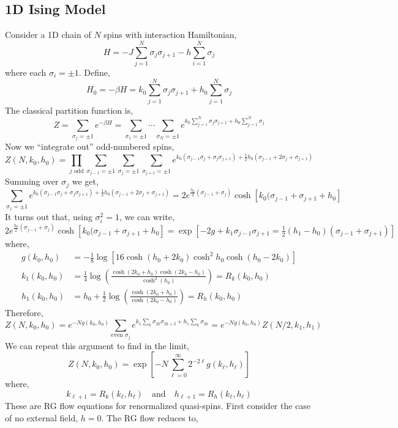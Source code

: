 \documentclass[12pt]{extarticle}
\begin{document}
\subsection{1D Ising Model}

Consider a 1D chain of $N$ spins with interaction Hamiltonian,
\[ H = - J \sum_{j = 1}^N \sigma_j \sigma_{j + 1} - h \sum_{i = 1}^N \sigma_j \]
where each $\sigma_i = \pm 1$. Define,
\[ H_0 = - \beta H = k_0 \sum_{j = 1}^N \sigma_j \sigma_{j + 1} + h_0 \sum_{j = 1}^N \sigma_j \]
The classical partition function is,
\[ Z = \sum_{\sigma_j = \pm 1} e^{- \beta H} = \sum_{\sigma_1  = \pm 1} \cdots \sum_{\sigma_N = \pm 1} e^{k_0 \sum_{j = 1}^N \sigma_j \sigma_{j + 1} + h_0 \sum_{j = 1}^N \sigma_j} \]
Now we ``integrate out'' odd-numbered spins,
\[ Z(N, k_0, h_0) = \prod_{j \text{ odd}} \sum_{\sigma_{j-1} = \pm 1} \sum_{\sigma_j = \pm 1} \sum_{\sigma_{j+1} = \pm 1} e^{k_0 (\sigma_{j-1} \sigma_j + \sigma_j \sigma_{j + 1}) + \tfrac{1}{2} h_0 (\sigma_{j - 1} + 2 \sigma_j + \sigma_{j + 1})} \]
Summing over $\sigma_j$ we get,
\[ \sum_{\sigma_j = \pm 1} e^{k_0 (\sigma_{j-1} \sigma_j + \sigma_j \sigma_{j + 1}) + \tfrac{1}{2} h_0 (\sigma_{j - 1} + 2 \sigma_j + \sigma_{j + 1})} = 2 e^{\frac{h_0}{2} (\sigma_{j-1} + \sigma_j)} \cosh{[k_0(\sigma_{j-1} + \sigma_{j+1} + h_0]} \]
It turns out that, using $\sigma_i^2 = 1$, we can write,
\[ 2 e^{\frac{h_0}{2} (\sigma_{j-1} + \sigma_j)} \cosh{[k_0(\sigma_{j-1} + \sigma_{j+1} + h_0]} = \exp{[-2 g + k_1 \sigma_{j-1} \sigma_{j+1} = \tfrac{1}{2} (h_1 - h_0) (\sigma_{j-1} + \sigma_{j+1})]} \]
where,
\begin{align*}
g(k_0, h_0) &= - \frac{1}{8} \log{\left[ 16 \cosh{(h_0 + 2 k_0)} \cosh^2{h_0} \cosh{(h_0 - 2 k _0)} \right]}
\\
k_1(k_0, h_0) &= \frac{1}{4} \log{\left( \frac{\cosh{(2 k_0 + h_0)} \cosh{(2 k_0 - h_0)}}{\cosh^2{(h_0)}} \right)} = R_k(k_0, h_0)
\\
h_1(k_0, h_0) &= h_0 + \frac{1}{2} \log{\left( \frac{\cosh{(2 k_0 + h_0)}}{\cosh{(2 k_0 - h_0)}} \right)} = R_h(k_0, h_0)
\end{align*}
Therefore,
\[ Z(N, k_0, h_0) = e^{-N g(k_0, h_0)} \sum_{\text{even } \sigma_j} e^{k_1 \sum_k \sigma_{2 k} \sigma_{2 k + 2} + h_1 \sum_k \sigma_{2 k}} = e^{- N g(k_0, h_0)} Z(N/2, k_1, h_1) \] 
We can repeat this argument to find in the limit,
\[ Z(N, k_0, h_0) = \exp{\left[ - N \sum_{\ell = 0}^{\infty} 2^{-2 \ell} g(k_{\ell}, h_{\ell}) \right]} \]
where,
\[ k_{\ell + 1} = R_k(k_{\ell}, h_{\ell}) \quad \text{and} \quad h_{\ell + 1} = R_{h}(k_{\ell}, h_{\ell}) \]
These are RG flow equations for renormalized quasi-spins. First consider the case of no external field, $h = 0$. The RG flow reduces to,
\end{document}
